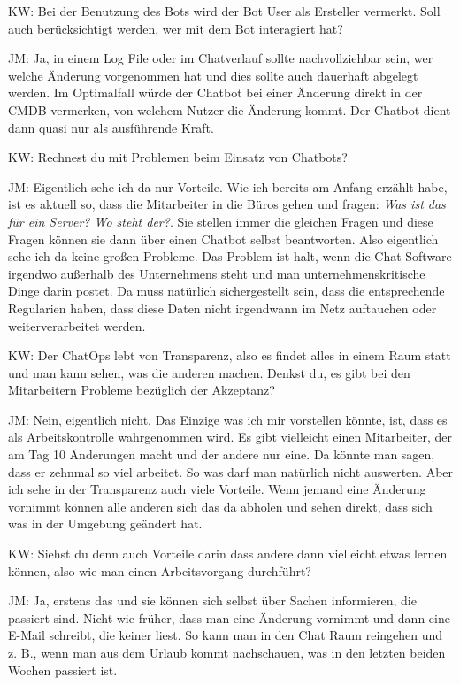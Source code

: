 \begin{list}{X:}{\setlength{\labelsep}{5mm}}
\item[KW:] Bei der Benutzung des Bots wird der Bot User als Ersteller vermerkt. Soll auch berücksichtigt werden, wer mit dem Bot interagiert hat?
\item[JM:] Ja, in einem Log File oder im Chatverlauf sollte nachvollziehbar sein, wer welche Änderung vorgenommen hat und dies sollte auch dauerhaft abgelegt werden. Im Optimalfall würde der Chatbot bei einer Änderung direkt in der CMDB vermerken, von welchem Nutzer die Änderung kommt. Der Chatbot dient dann quasi nur als ausführende Kraft.
\item[KW:] Rechnest du mit Problemen beim Einsatz von Chatbots?
\item[JM:] Eigentlich sehe ich da nur Vorteile. Wie ich bereits am Anfang erzählt habe, ist es aktuell so, dass die Mitarbeiter in die Büros gehen und fragen: \textit{Was ist das für ein Server? Wo steht der?}. Sie stellen immer die gleichen Fragen und diese Fragen können sie dann über einen Chatbot selbst beantworten. Also eigentlich sehe ich da keine großen Probleme. Das Problem ist halt, wenn die Chat Software irgendwo außerhalb des Unternehmens steht und man unternehmenskritische Dinge darin postet. Da muss natürlich sichergestellt sein, dass die entsprechende Regularien haben, dass diese Daten nicht irgendwann im Netz auftauchen oder weiterverarbeitet werden.
\item[KW:] Der ChatOps lebt von Transparenz, also es findet alles in einem Raum statt und man kann sehen, was die anderen machen. Denkst du, es gibt bei den Mitarbeitern Probleme bezüglich der Akzeptanz?
\item[JM:] Nein, eigentlich nicht. Das Einzige was ich mir vorstellen könnte, ist, dass es als Arbeitskontrolle wahrgenommen wird. Es gibt vielleicht einen Mitarbeiter, der am Tag 10 Änderungen macht und der andere nur eine. Da könnte man sagen, dass er zehnmal so viel arbeitet. So was darf man natürlich nicht auswerten. Aber ich sehe in der Transparenz auch viele Vorteile. Wenn jemand eine Änderung vornimmt können alle anderen sich das da abholen und sehen direkt, dass sich was in der Umgebung geändert hat. 
\item[KW:] Siehst du denn auch Vorteile darin dass andere dann vielleicht etwas lernen können, also wie man einen Arbeitsvorgang durchführt?
\item[JM:] Ja, erstens das und sie können sich selbst über Sachen informieren, die passiert sind. Nicht wie früher, dass man eine Änderung vornimmt und dann eine E-Mail schreibt, die keiner liest. So kann man in den Chat Raum reingehen und z. B., wenn man aus dem Urlaub kommt nachschauen, was in den letzten beiden Wochen passiert ist.

\end{list}
